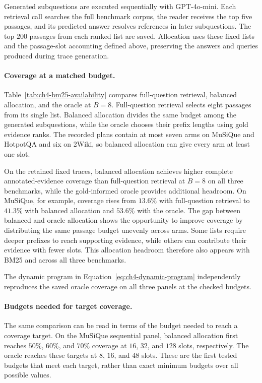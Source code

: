 Generated subquestions are executed sequentially with GPT-4o-mini. Each
retrieval call searches the full benchmark corpus, the reader receives the
top five passages, and its predicted answer resolves references in later
subquestions. The top $200$ passages from each ranked list are saved.
Allocation uses these fixed lists and the passage-slot accounting defined
above, preserving the answers and queries produced during trace generation.

\paragraph{Coverage at a matched budget.}
Table~\ref{tab:ch4-bm25-availability} compares full-question retrieval,
balanced allocation, and the oracle at $B=8$. Full-question retrieval
selects eight passages from its single list. Balanced allocation divides
the same budget among the generated subquestions, while the oracle chooses
their prefix lengths using gold evidence ranks. The recorded plans contain
at most seven arms on MuSiQue and HotpotQA and six on 2Wiki, so balanced
allocation can give every arm at least one slot.



On the retained fixed traces, balanced allocation achieves higher complete
annotated-evidence coverage than full-question retrieval at \(B=8\) on all
three benchmarks, while the gold-informed oracle provides additional headroom. 
On MuSiQue, for example,
coverage rises from $13.6\%$ with full-question retrieval to
$41.3\%$ with balanced allocation and $53.6\%$ with the oracle.
The gap between balanced and oracle allocation shows the
opportunity to improve coverage by distributing the same
passage budget unevenly across arms. Some lists require deeper
prefixes to reach supporting evidence, while others can
contribute their evidence with fewer slots. This allocation
headroom therefore also appears with BM25 and across all three
benchmarks.

The dynamic program in Equation~\ref{eq:ch4-dynamic-program}
independently reproduces the saved oracle coverage on all three panels at
the checked budgets.

\paragraph{Budgets needed for target coverage.}
The same comparison can be read in terms of the budget needed
to reach a coverage target. On the MuSiQue sequential panel,
balanced allocation first reaches $50\%$, $60\%$, and $70\%$
coverage at $16$, $32$, and $128$ slots, respectively. The
oracle reaches these targets at $8$, $16$, and $48$ slots.
These are the first tested budgets that meet each target,
rather than exact minimum budgets over all possible values.

